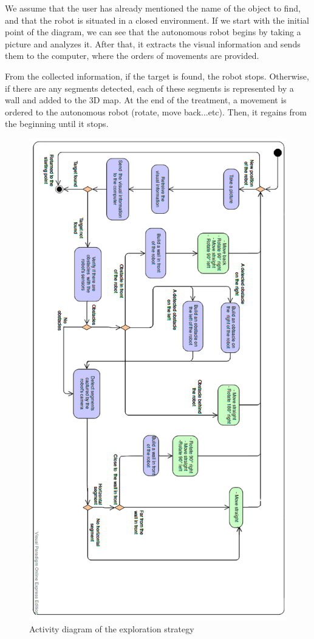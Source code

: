 \documentclass[12pt]{report}
\begin{document}
We assume that the user has already mentioned the name of the object to find, and that the robot is situated in a closed 
environment. If we start with the initial point of the diagram, we can see that the autonomous robot begins by taking a 
picture and analyzes it. After that, it extracts the visual information and sends them to the computer, where the orders 
of movements are provided. 

From the collected information, if the target is found, the robot stops. Otherwise, if there are any segments detected, 
each of these segments is represented by a wall and added to the 3D map. At the end of the treatment, a movement is 
ordered to the autonomous robot (rotate, move back...etc). Then, it regains from the beginning until it stops.

\begin{figure}[H]
	\begin{center}
		\includegraphics[scale=0.445]{res/order_processing.png}
		\caption{Activity diagram of the exploration strategy}
		\label{fig:activityDiag}
	\end{center}
\end{figure}
\end{document}
